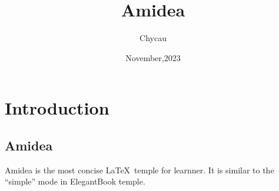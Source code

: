 \documentclass[black]{amidea}
\title{Amidea}
\subtitle{}
\author{Chycau}
\date{November,2023}
\begin{document}
\maketitle

\chapter{Introduction}
\section{Amidea}

Amidea is the most concise \LaTeX\ temple for learnner. It is similar to the ``simple'' mode in ElegantBook temple.
\end{document}
